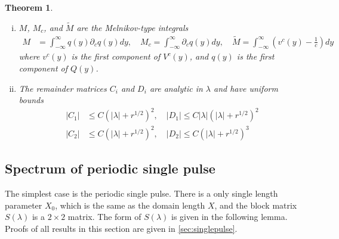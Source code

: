 \documentclass[10pt,reqno]{amsart}
\theoremstyle{plain}
\newtheorem{theorem}{Theorem}
\theoremstyle{definition}
\theoremstyle{remark}
\numberwithin{theorem}{section}
\numberwithin{equation}{section}
\begin{document}
\begin{theorem}
\begin{enumerate}[(i)]
\item $M$, $M_c$, and $\tilde{M}$ are the Melnikov-type integrals
\begin{align*}
M &= \int_{-\infty}^\infty q(y) \partial_c q(y) dy, \quad
M_c = \int_{-\infty}^\infty \partial_c q(y) dy, \quad
\tilde{M} = \int_{-\infty}^{\infty} \left(v^c(y) - \frac{1}{c}\right) dy
\end{align*}
where $v^c(y)$ is the first component of $V^c(y)$, and $q(y)$ is the first component of $Q(y)$.

\item The remainder matrices $C_i$ and $D_i$ are analytic in $\lambda$ and have uniform bounds
\begin{align*}
|C_1| &\leq C (|\lambda| + r^{1/2})^2, \quad
|D_1| \leq C |\lambda|(|\lambda| + r^{1/2})^2 \\
|C_2| &\leq C (|\lambda| + r^{1/2})^2, \quad
|D_2| \leq C (|\lambda| + r^{1/2})^3 
\end{align*}
\end{enumerate}
\end{theorem}

\subsection{Spectrum of periodic single pulse}\label{sec:persingle}

The simplest case is the periodic single pulse. There is a only single length parameter $X_0$, which is the same as the domain length $X$, and the block matrix $S(\lambda)$ is a $2\times 2$ matrix. The form of $S(\lambda)$ is given in the following lemma. Proofs of all results in this section are given in \cref{sec:singlepulse}. 
\end{document}
